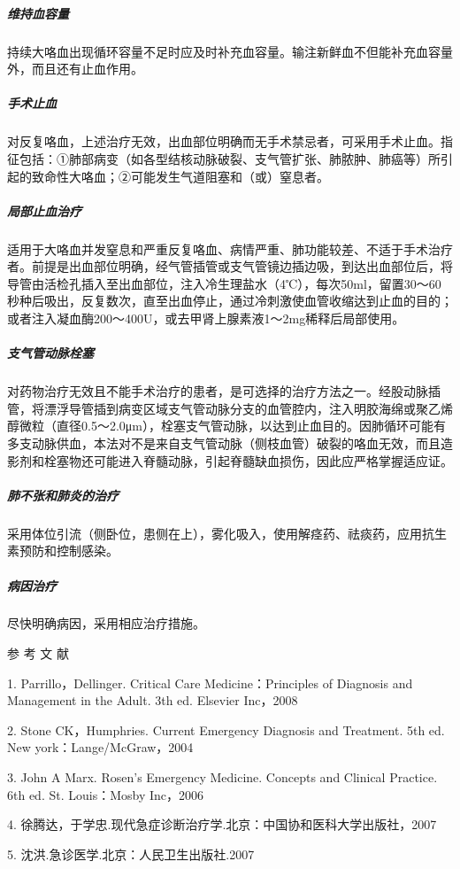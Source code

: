 \subparagraph{维持血容量}

持续大咯血出现循环容量不足时应及时补充血容量。输注新鲜血不但能补充血容量外，而且还有止血作用。

\subparagraph{手术止血}

对反复咯血，上述治疗无效，出血部位明确而无手术禁忌者，可采用手术止血。指征包括：①肺部病变（如各型结核动脉破裂、支气管扩张、肺脓肿、肺癌等）所引起的致命性大咯血；②可能发生气道阻塞和（或）窒息者。

\subparagraph{局部止血治疗}

适用于大咯血并发窒息和严重反复咯血、病情严重、肺功能较差、不适于手术治疗者。前提是出血部位明确，经气管插管或支气管镜边插边吸，到达出血部位后，将导管由活检孔插入至出血部位，注入冷生理盐水（4℃），每次50ml，留置30～60秒种后吸出，反复数次，直至出血停止，通过冷刺激使血管收缩达到止血的目的；或者注入凝血酶200～400U，或去甲肾上腺素液1～2mg稀释后局部使用。

\subparagraph{支气管动脉栓塞}

对药物治疗无效且不能手术治疗的患者，是可选择的治疗方法之一。经股动脉插管，将漂浮导管插到病变区域支气管动脉分支的血管腔内，注入明胶海绵或聚乙烯醇微粒（直径0.5～2.0μm），栓塞支气管动脉，以达到止血目的。因肺循环可能有多支动脉供血，本法对不是来自支气管动脉（侧枝血管）破裂的咯血无效，而且造影剂和栓塞物还可能进入脊髓动脉，引起脊髓缺血损伤，因此应严格掌握适应证。

\subparagraph{肺不张和肺炎的治疗}

采用体位引流（侧卧位，患侧在上），雾化吸入，使用解痉药、祛痰药，应用抗生素预防和控制感染。

\subparagraph{病因治疗}

尽快明确病因，采用相应治疗措施。

\protect\hypertarget{text00025.html}{}{}

\hypertarget{text00025.htmlux5cux23CHP1-9-5}{}
参 考 文 献

1. Parrillo，Dellinger. Critical Care Medicine：Principles of Diagnosis
and Management in the Adult. 3th ed. Elsevier Inc，2008

2. Stone CK，Humphries. Current Emergency Diagnosis and Treatment. 5th
ed. New york：Lange/McGraw，2004

3. John A Marx. Rosen's Emergency Medicine. Concepts and Clinical
Practice. 6th ed. St. Louis：Mosby Inc，2006

4. 徐腾达，于学忠.现代急症诊断治疗学.北京：中国协和医科大学出版社，2007

5. 沈洪.急诊医学.北京：人民卫生出版社.2007

